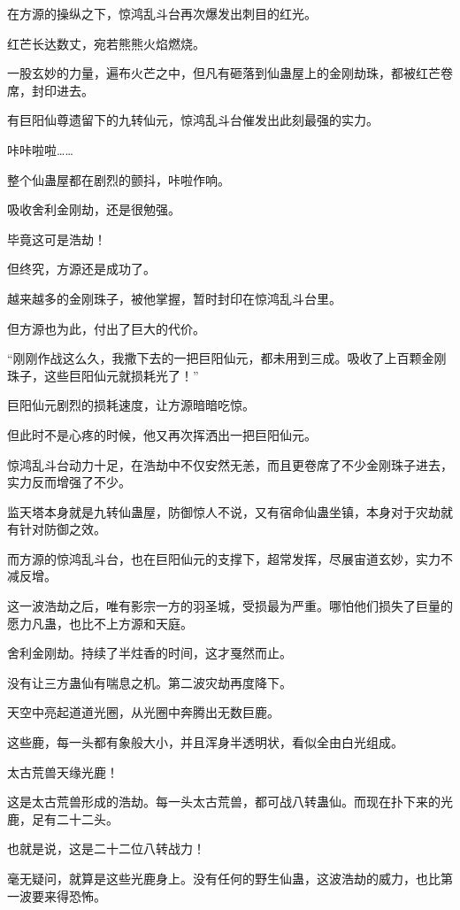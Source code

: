 
\begin{this_body}

在方源的操纵之下，惊鸿乱斗台再次爆发出刺目的红光。

红芒长达数丈，宛若熊熊火焰燃烧。

一股玄妙的力量，遍布火芒之中，但凡有砸落到仙蛊屋上的金刚劫珠，都被红芒卷席，封印进去。

有巨阳仙尊遗留下的九转仙元，惊鸿乱斗台催发出此刻最强的实力。

咔咔啦啦……

整个仙蛊屋都在剧烈的颤抖，咔啦作响。

吸收舍利金刚劫，还是很勉强。

毕竟这可是浩劫！

但终究，方源还是成功了。

越来越多的金刚珠子，被他掌握，暂时封印在惊鸿乱斗台里。

但方源也为此，付出了巨大的代价。

“刚刚作战这么久，我撒下去的一把巨阳仙元，都未用到三成。吸收了上百颗金刚珠子，这些巨阳仙元就损耗光了！”

巨阳仙元剧烈的损耗速度，让方源暗暗吃惊。

但此时不是心疼的时候，他又再次挥洒出一把巨阳仙元。

惊鸿乱斗台动力十足，在浩劫中不仅安然无恙，而且更卷席了不少金刚珠子进去，实力反而增强了不少。

监天塔本身就是九转仙蛊屋，防御惊人不说，又有宿命仙蛊坐镇，本身对于灾劫就有针对防御之效。

而方源的惊鸿乱斗台，也在巨阳仙元的支撑下，超常发挥，尽展宙道玄妙，实力不减反增。

这一波浩劫之后，唯有影宗一方的羽圣城，受损最为严重。哪怕他们损失了巨量的愿力凡蛊，也比不上方源和天庭。

舍利金刚劫。持续了半炷香的时间，这才戛然而止。

没有让三方蛊仙有喘息之机。第二波灾劫再度降下。

天空中亮起道道光圈，从光圈中奔腾出无数巨鹿。

这些鹿，每一头都有象般大小，并且浑身半透明状，看似全由白光组成。

太古荒兽天缘光鹿！

这是太古荒兽形成的浩劫。每一头太古荒兽，都可战八转蛊仙。而现在扑下来的光鹿，足有二十二头。

也就是说，这是二十二位八转战力！

毫无疑问，就算是这些光鹿身上。没有任何的野生仙蛊，这波浩劫的威力，也比第一波要来得恐怖。


\end{this_body}
